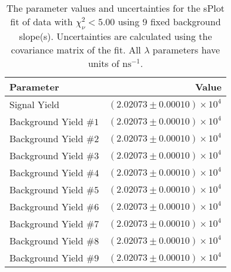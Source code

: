 
\begin{table}
    \begin{center}
        \begin{tabular}{lr}\toprule
            Parameter & Value \\\midrule
            Signal Yield & $(2.02073 \pm 0.00010) \times 10^{4}$ \\
            Background Yield $\#1$ & $(2.02073 \pm 0.00010) \times 10^{4}$ \\
            Background Yield $\#2$ & $(2.02073 \pm 0.00010) \times 10^{4}$ \\
            Background Yield $\#3$ & $(2.02073 \pm 0.00010) \times 10^{4}$ \\
            Background Yield $\#4$ & $(2.02073 \pm 0.00010) \times 10^{4}$ \\
            Background Yield $\#5$ & $(2.02073 \pm 0.00010) \times 10^{4}$ \\
            Background Yield $\#6$ & $(2.02073 \pm 0.00010) \times 10^{4}$ \\
            Background Yield $\#7$ & $(2.02073 \pm 0.00010) \times 10^{4}$ \\
            Background Yield $\#8$ & $(2.02073 \pm 0.00010) \times 10^{4}$ \\
            Background Yield $\#9$ & $(2.02073 \pm 0.00010) \times 10^{4}$ \\\bottomrule
        \end{tabular}
        \caption{The parameter values and uncertainties for the sPlot fit of data with $\chi^2_\nu < 5.00$ using 9 fixed background slope(s). Uncertainties are calculated using the covariance matrix of the fit. All $\lambda$ parameters have units of $\si{\nano\second}^{-1}$.}
    \end{center}
\end{table}
